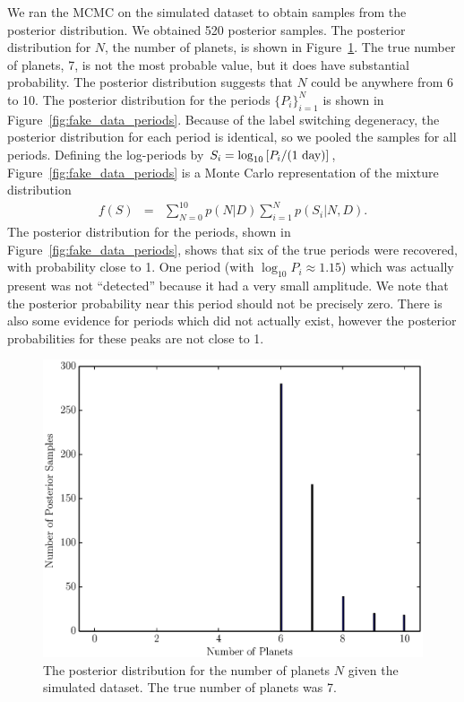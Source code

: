 \documentclass[useAMS,usenatbib]{mn2e}
\begin{document}
We ran the MCMC on the simulated dataset to obtain samples from the
posterior distribution. We obtained 520 posterior samples.
The posterior distribution for $N$, the number of
planets, is shown in Figure~\ref{fig:fake_data_N}. The true number of planets,
7, is not the most probable value, but it does have substantial probability.
The posterior distribution suggests that $N$ could be anywhere from 6 to 10.
The posterior distribution for the periods $\{P_i\}_{i=1}^N$ is shown in
Figure~\ref{fig:fake_data_periods}. Because of the label switching degeneracy,
the posterior distribution for each period is identical, so we pooled the
samples for all periods. Defining the log-periods by
$S_i =  \log_{10}\left[P_i/(\textnormal{1 day})\right]$,
Figure~\ref{fig:fake_data_periods} is a Monte Carlo representation
of the mixture distribution
\begin{eqnarray}
f(S) &=& \sum_{N=0}^{10} p(N | D)\sum_{i=1}^N p(S_i | N, D).
\end{eqnarray}
The posterior distribution for the periods, shown in
Figure~\ref{fig:fake_data_periods}, shows that six of the true periods were
recovered, with probability close to 1. One period (with $\log_{10}P_i \approx 1.15$)
which was actually present was not ``detected'' because it had a very small
amplitude. We note that the posterior probability near this period should not be
precisely zero. There is also some
evidence for periods which did not actually exist, however the posterior
probabilities for these peaks are not close to 1.

\begin{figure}
\includegraphics[scale=0.4]{Figures/fake_data_N.eps}
\caption{The posterior distribution for the number of planets $N$ given the
simulated dataset. The true number of planets was 7.
\label{fig:fake_data_N}}
\end{figure}
\end{document}
